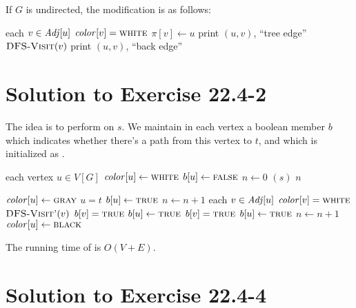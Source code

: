 \documentclass[a4paper, fleqn]{article}
\begin{document}
If $G$ is undirected, the modification is as follows:

\begin{codebox}
\li \For each $v \in \id{Adj}[u]$
\li   \Do
        \If $\id{color}[v] = \const{white}$
\li       \Then
            $\pi[v] \gets u$
\li         print $(u, v)$, ``tree edge''
\li         $\textnormal{\scshape DFS-Visit}(v)$
\li       \Else
            print $(u, v)$, ``back edge''
          \End
      \End
\end{codebox}


\section*{Solution to Exercise 22.4-2}

The idea is to perform  on $s$. We maintain in each vertex a boolean member $b$ which indicates whether there's a path from this vertex to $t$, and which is initialized as .

\begin{codebox}
\li \For each vertex $u \in V[G]$
\li   \Do
        $\id{color}[u] \gets \const{white}$
\li     $b[u] \gets \textnormal{\scshape false}$
      \End
\li $n \gets 0$
\li {}$(s)$
\li \Return $n$
\end{codebox}

\begin{codebox}
\li $\id{color}[u] \gets \const{gray}$
\li \If $u = t$
\li   \Then
        $b[u] \gets \textnormal{\scshape true}$
\li     $n \gets n + 1$
\li   \Else
        \For each $v \in \id{Adj}[u]$
\li       \Do
            \If $\id{color}[v] = \const{white}$
\li           \Then
                $\textnormal{\scshape DFS-Visit'}(v)$
\li             \If $b[v] = \textnormal{\scshape true}$
\li               \Then
                    $b[u] \gets \textnormal{\scshape true}$
                  \End
\li         \ElseIf $b[v] = \textnormal{\scshape true}$
\li           \Then
                $b[u] \gets \textnormal{\scshape true}$
\li             $n \gets n + 1$
              \End
          \End
      \End
\li $\id{color}[u] \gets \const{black}$
\end{codebox}

The running time of  is $O(V + E)$.


\section*{Solution to Exercise 22.4-4}
\end{document}
